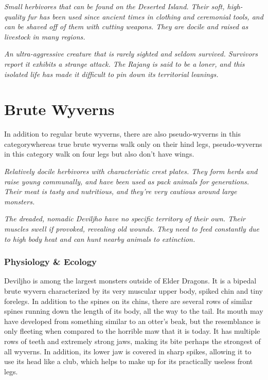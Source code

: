 \textit{Small herbivores that can be found on the Deserted Island. Their soft, high-quality fur has been used since ancient times in clothing and ceremonial tools, and can be shaved off of them with cutting weapons. They are docile and raised as livestock in many regions.}

\textit{An ultra-aggressive creature that is rarely sighted and seldom survived. Survivors report it exhibits a strange attack. The Rajang is said to be a loner, and this isolated life has made it difficult to pin down its territorial leanings.}

\section{Brute Wyverns}
In addition to regular brute wyverns, there are also pseudo-wyverns in this category\hbNone whereas true brute wyverns walk only on their hind legs, pseudo-wyverns in this category walk on four legs but also don't have wings.

\textit{Relatively docile herbivores with characteristic crest plates. They form herds and raise young communally, and have been used as pack animals for generations. Their meat is tasty and nutritious, and they're very cautious around large monsters.}

\textit{The dreaded, nomadic Deviljho have no specific territory of their own. Their muscles swell if provoked, revealing old wounds. They need to feed constantly due to high body heat and can hunt nearby animals to extinction.}%

\subsubsection{Physiology \& Ecology}
Deviljho is among the largest monsters outside of Elder Dragons. It is a bipedal brute wyvern characterized by its very muscular upper body, spiked chin and tiny forelegs. In addition to the spines on its chins, there are several rows of similar spines running down the length of its body, all the way to the tail. Its mouth may have developed from something similar to an otter's beak, but the resemblance is only fleeting when compared to the horrible maw that it is today. It has multiple rows of teeth and extremely strong jaws, making its bite perhaps the strongest of all wyverns. In addition, its lower jaw is covered in sharp spikes, allowing it to use its head like a club, which helps to make up for its practically useless front legs.


